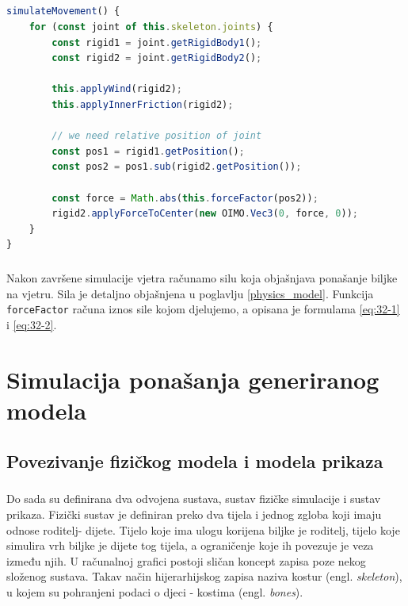 \documentclass[times, utf8, diplomski]{fer}
\begin{document}
\paragraph{}
\begin{lstlisting}[language=Javascript,label=code33-5,caption=Fizička simulacija ponašanja biljke.]
simulateMovement() {
	for (const joint of this.skeleton.joints) {
		const rigid1 = joint.getRigidBody1();
		const rigid2 = joint.getRigidBody2();

		this.applyWind(rigid2);
		this.applyInnerFriction(rigid2);

		// we need relative position of joint
		const pos1 = rigid1.getPosition();
		const pos2 = pos1.sub(rigid2.getPosition());

		const force = Math.abs(this.forceFactor(pos2));
		rigid2.applyForceToCenter(new OIMO.Vec3(0, force, 0));
	}
}
\end{lstlisting}

\paragraph{}
Nakon završene simulacije vjetra računamo silu koja objašnjava ponašanje biljke na 
vjetru. Sila je detaljno objašnjena u poglavlju \ref{physics_model}. Funkcija 
\verb#forceFactor# računa iznos sile kojom djelujemo, a opisana je formulama \ref{eq:32-1} i 
\ref{eq:32-2}.

\chapter{Simulacija ponašanja generiranog modela}
\section{Povezivanje fizičkog modela i modela prikaza}
\paragraph{}
Do sada su definirana dva odvojena sustava, sustav fizičke simulacije i sustav prikaza. 
Fizički sustav je definiran preko dva tijela i jednog zgloba koji imaju odnose roditelj-
dijete. Tijelo koje ima ulogu korijena biljke je roditelj, tijelo koje simulira vrh biljke 
je dijete tog tijela, a ograničenje koje ih povezuje je veza između njih. U računalnoj 
grafici postoji sličan koncept zapisa poze nekog složenog sustava. Takav način 
hijerarhijskog zapisa naziva kostur (engl. \textit{skeleton}), u kojem su pohranjeni podaci 
o djeci - kostima (engl. \textit{bones}).
\end{document}
